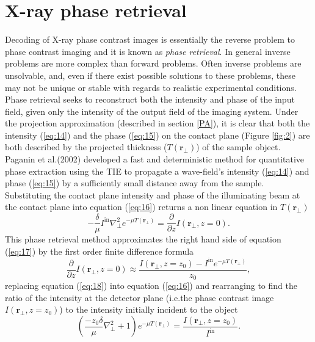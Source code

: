 \documentclass[10pt, a4paper, singlespacing]{report}
\begin{document}
\section{X-ray phase retrieval}\label{PR}
Decoding of X-ray phase contrast images is essentially the reverse problem to phase contrast imaging and it is known as \textit{phase retrieval}. 
In general inverse problems are more complex than forward problems. Often inverse problems are unsolvable, and, even if there exist possible solutions to these problems, these may not be unique or stable with regards to realistic experimental conditions. 
Phase retrieval seeks to reconstruct both the intensity and phase of the input field, given only the intensity of the output field of the imaging system\cite{PagsTutes}\cite{Pags2002}. Under the projection approximation (described in section \ref{PA}), it is clear that both the intensity (\ref{eq:14}) and the phase (\ref{eq:15}) on the contact plane (Figure \ref{fig:2}) are both described by the projected thickness ($T(\mathbf{r}_{\perp})$) of the sample object. Paganin et al.(2002) developed a fast and deterministic method for quantitative phase extraction\cite{Pags2002} using the TIE to propagate a wave-field's intensity (\ref{eq:14}) and phase (\ref{eq:15}) by a sufficiently small distance away from the sample.
Substituting the contact plane intensity and phase of the illuminating beam at the contact plane into equation (\ref{eq:16}) returns a non linear equation in $T(\mathbf{r}_{\perp})$
\begin{equation}\label{eq:17}
- \frac{\delta}{\mu} I^{\mathrm{in}} \nabla^{2}_{\perp} e^{-\mu T(\mathbf{r}_{\perp})} = \frac{\partial}{\partial z}I(\mathbf{r}_{\perp}, z=0).
\end{equation}
This phase retrieval method\cite{Pags2002} approximates the right hand side of equation (\ref{eq:17}) by the first order finite difference formula
\begin{equation}\label{eq:18}
\frac{\partial}{\partial z}I(\mathbf{r}_{\perp}, z=0) \approx \frac{I(\mathbf{r}_{\perp}, z=z_0) - I^{\mathrm{in}} e^{-\mu T(\mathbf{r}_{\perp})}}{z_0},
\end{equation}
replacing equation (\ref{eq:18}) into equation (\ref{eq:16}) and rearranging to find the ratio of the intensity at the detector plane (i.e.the phase contrast image $I(\mathbf{r}_{\perp}, z = z_0)$) to the intensity initially incident to the object
 \begin{equation}\label{eq:19}
\left (\frac{- z_0 \delta}{\mu}\nabla^{2}_{\perp} + 1 \right )e^{-\mu T(\mathbf{r}_{\perp})} = \frac{I(\mathbf{r}_{\perp}, z=z_0)}{I^{\mathrm{in}}}.
\end{equation}
\end{document}
